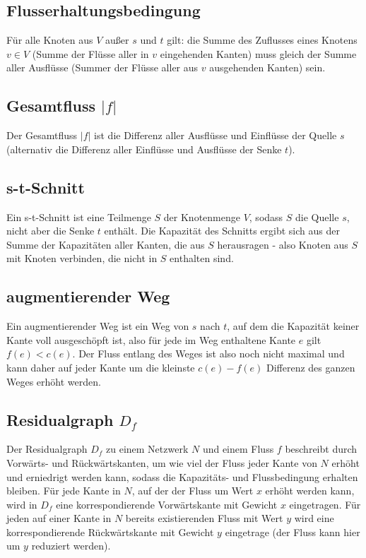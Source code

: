 \documentclass[10pt,a4paper,landscape]{article}
\begin{document}
\begin{multicols*}{2}
    \subsection*{ Flusserhaltungsbedingung }
    Für alle Knoten aus $V$ außer $s$ und $t$ gilt: die Summe des Zuflusses eines Knotens $v \in V$ (Summe der Flüsse aller in $v$ eingehenden Kanten) muss gleich der Summe aller 
    Ausflüsse (Summer der Flüsse aller aus $v$ ausgehenden Kanten) sein.

    \subsection*{ Gesamtfluss $|f|$ }
    Der Gesamtfluss $|f|$ ist die Differenz aller Ausflüsse und Einflüsse der Quelle $s$ (alternativ die Differenz aller Einflüsse und 
    Ausflüsse der Senke $t$).

    \subsection*{ s-t-Schnitt }
    Ein s-t-Schnitt ist eine Teilmenge $S$ der Knotenmenge $V$, sodass $S$ die Quelle $s$, nicht aber die Senke $t$ enthält.
    Die Kapazität des Schnitts ergibt sich aus der Summe der Kapazitäten aller Kanten, die aus $S$ herausragen - also Knoten aus $S$ 
    mit Knoten verbinden, die nicht in $S$ enthalten sind.

    \subsection*{ augmentierender Weg }
    Ein augmentierender Weg ist ein Weg von $s$ nach $t$, auf dem die Kapazität keiner Kante voll ausgeschöpft ist, also für jede im Weg enthaltene 
    Kante $e$ gilt $f(e) < c(e)$. Der Fluss entlang des Weges ist also noch nicht maximal und kann daher auf jeder Kante um die kleinste $c(e) - f(e)$ 
    Differenz des ganzen Weges erhöht werden.

    \subsection*{ Residualgraph $D_f$ }
    Der Residualgraph $D_f$ zu einem Netzwerk $N$ und einem Fluss $f$ beschreibt durch Vorwärts- und Rückwärtskanten, um wie viel der Fluss jeder Kante von $N$ 
    erhöht und erniedrigt werden kann, sodass die Kapazitäts- und Flussbedingung erhalten bleiben. Für jede Kante in $N$, auf der der Fluss um Wert $x$ erhöht 
    werden kann, wird in $D_f$ eine korrespondierende Vorwärtskante mit Gewicht $x$ eingetragen. Für jeden auf einer Kante in $N$ bereits existierenden Fluss mit Wert $y$ 
    wird eine korrespondierende Rückwärtskante mit Gewicht $y$ eingetrage (der Fluss kann hier um $y$ reduziert werden).
    

\end{multicols*}
\end{document}
